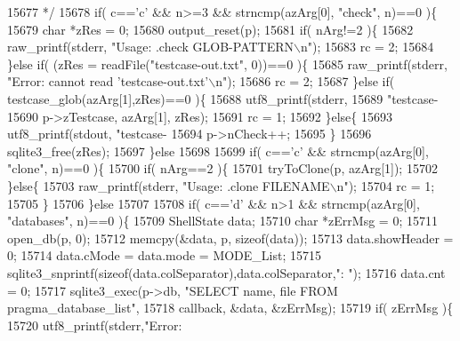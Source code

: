\begin{DoxyCode}
{{{{{15677 \textcolor{comment}{  */}
15678   \textcolor{keywordflow}{if}( c==\textcolor{charliteral}{'c'} && n>=3 && strncmp(azArg[0], \textcolor{stringliteral}{"check"}, n)==0 )\{
15679     \textcolor{keywordtype}{char} *zRes = 0;
15680     output_reset(p);
15681     \textcolor{keywordflow}{if}( nArg!=2 )\{
15682       raw_printf(stderr, \textcolor{stringliteral}{"Usage: .check GLOB-PATTERN\(\backslash\)n"});
15683       rc = 2;
15684     \}\textcolor{keywordflow}{else} \textcolor{keywordflow}{if}( (zRes = readFile(\textcolor{stringliteral}{"testcase-out.txt"}, 0))==0 )\{
15685       raw_printf(stderr, \textcolor{stringliteral}{"Error: cannot read 'testcase-out.txt'\(\backslash\)n"});
15686       rc = 2;
15687     \}\textcolor{keywordflow}{else} \textcolor{keywordflow}{if}( testcase_glob(azArg[1],zRes)==0 )\{
15688       utf8_printf(stderr,
15689                  \textcolor{stringliteral}{"testcase-%
15690                  p->zTestcase, azArg[1], zRes);
15691       rc = 1;
15692     \}\textcolor{keywordflow}{else}\{
15693       utf8_printf(stdout, \textcolor{stringliteral}{"testcase-%
15694       p->nCheck++;
15695     \}
15696     sqlite3_free(zRes);
15697   \}\textcolor{keywordflow}{else}
15698 
15699   \textcolor{keywordflow}{if}( c==\textcolor{charliteral}{'c'} && strncmp(azArg[0], \textcolor{stringliteral}{"clone"}, n)==0 )\{
15700     \textcolor{keywordflow}{if}( nArg==2 )\{
15701       tryToClone(p, azArg[1]);
15702     \}\textcolor{keywordflow}{else}\{
15703       raw_printf(stderr, \textcolor{stringliteral}{"Usage: .clone FILENAME\(\backslash\)n"});
15704       rc = 1;
15705     \}
15706   \}\textcolor{keywordflow}{else}
15707 
15708   \textcolor{keywordflow}{if}( c==\textcolor{charliteral}{'d'} && n>1 && strncmp(azArg[0], \textcolor{stringliteral}{"databases"}, n)==0 )\{
15709     ShellState data;
15710     \textcolor{keywordtype}{char} *zErrMsg = 0;
15711     open_db(p, 0);
15712     memcpy(&data, p, \textcolor{keyword}{sizeof}(data));
15713     data.showHeader = 0;
15714     data.cMode = data.mode = MODE_List;
15715     sqlite3_snprintf(\textcolor{keyword}{sizeof}(data.colSeparator),data.colSeparator,\textcolor{stringliteral}{": "});
15716     data.cnt = 0;
15717     sqlite3_exec(p->db, \textcolor{stringliteral}{"SELECT name, file FROM pragma\_database\_list"},
15718                  callback, &data, &zErrMsg);
15719     \textcolor{keywordflow}{if}( zErrMsg )\{
15720       utf8_printf(stderr,\textcolor{stringliteral}{"Error: %
}}}}}}}}
\end{DoxyCode}
